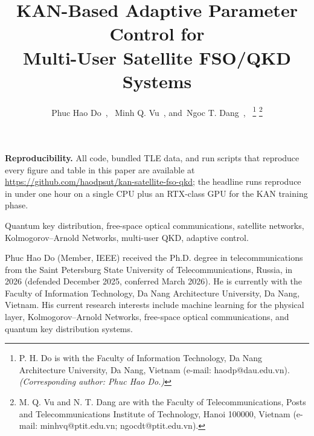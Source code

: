 \documentclass[journal,10pt]{IEEEtran}
\begin{document}


\title{KAN-Based Adaptive Parameter Control for\\ Multi-User Satellite FSO/QKD Systems}

\author{%
  Phuc Hao Do~,~
  Minh Q. Vu~,
  and~Ngoc T. Dang~,~%
  \thanks{P. H. Do is with the Faculty of Information Technology, Da Nang Architecture University, Da Nang, Vietnam (e-mail: haodp@dau.edu.vn). \emph{(Corresponding author: Phuc Hao Do.)}}%
  \thanks{M. Q. Vu and N. T. Dang are with the Faculty of Telecommunications, Posts and Telecommunications Institute of Technology, Hanoi 100000, Vietnam (e-mail: minhvq@ptit.edu.vn; ngocdt@ptit.edu.vn).}%
}


\maketitle



\noindent\textbf{Reproducibility.} All code, bundled TLE data, and run scripts that reproduce every figure and table in this paper are available at \url{https://github.com/haodpsut/kan-satellite-fso-qkd}; the headline runs reproduce in under one hour on a single CPU plus an RTX-class GPU for the KAN training phase.

\begin{IEEEkeywords}
Quantum key distribution, free-space optical communications, satellite networks, Kolmogorov--Arnold Networks, multi-user QKD, adaptive control.
\end{IEEEkeywords}












\begin{IEEEbiographynophoto}{Phuc Hao Do}
(Member, IEEE) received the Ph.D. degree in telecommunications from the Saint Petersburg State University of Telecommunications, Russia, in 2026 (defended December 2025, conferred March 2026). He is currently with the Faculty of Information Technology, Da Nang Architecture University, Da Nang, Vietnam. His current research interests include machine learning for the physical layer, Kolmogorov--Arnold Networks, free-space optical communications, and quantum key distribution systems.
\end{IEEEbiographynophoto}
\end{document}
